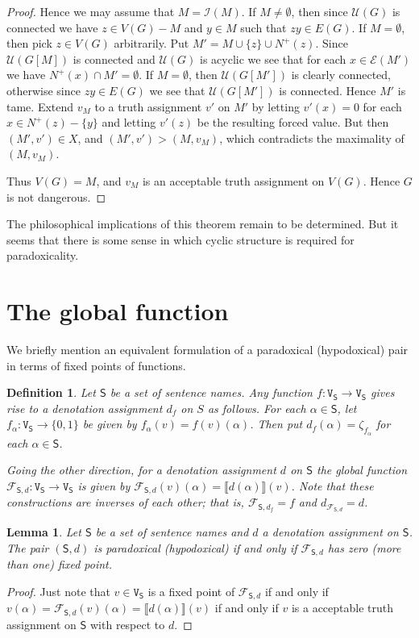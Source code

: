 \documentclass[12pt]{kluwer}
\newtheorem{lem}[thm]{Lemma}
\newtheorem{defn}{Definition}
\theoremstyle{remark}
\newcommand{\fancy}[1]{\mathcal{#1}}
\def\S{\textsf{S}}
\def\V{\texttt{V}}
\def\F{\fancy{F}}
\def\I{\fancy{I}}
\def\U{\fancy{U}}
\def\E{\fancy{E}}
\def\F{\fancy{F}}
\begin{document}
\begin{proof}
Hence we may assume that $M = \I(M)$.  If $M \neq \emptyset$, then since $\U(G)$ is connected we have $z \in V(G) - M$ and $y \in M$ such that $zy \in E(G)$.  If $M = \emptyset$, then pick $z \in V(G)$ arbitrarily. Put $M' = M \cup \{z\} \cup N^+(z)$.  Since $\U(G[M])$ is connected and $\U(G)$ is acyclic we see that for each $x \in \E(M')$ we have $N^+(x) \cap M' = \emptyset$.  If $M = \emptyset$, then $\U(G[M'])$ is clearly connected, otherwise since $zy \in E(G)$ we see that $\U(G[M'])$ is connected.  Hence $M'$ is tame.  Extend $v_M$ to a truth assignment $v'$ on $M'$ by letting $v'(x) = 0$ for each $x \in N^+(z) - \{y\}$ and letting $v'(z)$ be the resulting forced value.  But then $(M', v') \in X$, and $(M', v') > (M, v_M)$, which contradicts the maximality of $(M, v_M)$.

Thus $V(G) = M$, and $v_M$ is an acceptable truth assignment on $V(G)$.  Hence $G$ is not dangerous. 
\end{proof}

The philosophical implications of this theorem remain to be determined. But it seems that there is some sense in which cyclic structure is required for paradoxicality.

\appendix

\section{The global function}
\label{sec7}

We briefly mention an equivalent formulation of a paradoxical (hypodoxical) pair in terms of fixed points of functions.

\begin{defn}
Let $\S$ be a set of sentence names. Any function $f: \V_\S \rightarrow \V_\S$ gives rise to a denotation assignment $d_f$ on $S$ as follows.  For each $\alpha \in \S$, let $f_{\alpha}: \V_\S \rightarrow \{0, 1\}$ be given by $f_{\alpha}(v) = f(v)(\alpha)$.  Then put $d_f(\alpha) = \zeta_{f_{\alpha}}$ for each $\alpha \in \S$.

Going the other direction, for a denotation assignment $d$ on $\S$ the \emph{global function} $\F_{\S, d} :\V_\S \rightarrow \V_\S$ is given by $\F_{\S, d}(v)(\alpha) = \llbracket d(\alpha) \rrbracket(v)$. Note that these constructions are inverses of each other; that is, $\F_{\S, d_f} = f$ and $d_{\F_{\S, d}} = d$.
\end{defn}

\begin{lem}
Let $\S$ be a set of sentence names and $d$ a denotation assignment on $\S$.  The pair $(\S, d)$ is paradoxical (hypodoxical) if and only if $\F_{\S, d}$ has zero (more than one) fixed point.
\end{lem}
\begin{proof}
Just note that $v \in \V_\S$ is a fixed point of $\F_{\S, d}$ if and only if $v(\alpha) = \F_{\S, d}(v)(\alpha) = \llbracket d(\alpha) \rrbracket(v)$ if and only if $v$ is a acceptable truth assignment on $\S$ with respect to $d$.
\end{proof}
\end{document}
